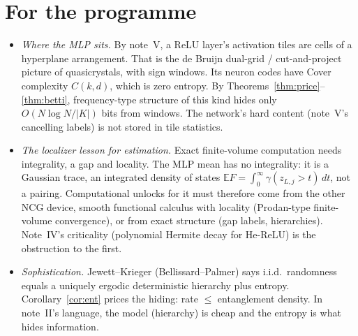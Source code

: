 \documentclass[11pt]{article}
\theoremstyle{definition}
\theoremstyle{remark}
\newcommand{\E}{\mathbb E}
\begin{document}
\section{For the programme}
\begin{itemize}
\item \emph{Where the MLP sits.} By note~V, a ReLU layer's activation tiles are cells of a hyperplane arrangement. That is the de Bruijn dual-grid / cut-and-project picture of quasicrystals, with sign windows. Its neuron codes have Cover complexity $C(k,d)$, which is zero entropy. By Theorems~\ref{thm:price}--\ref{thm:betti}, frequency-type structure of this kind hides only $O(N\log N/|K|)$ bits from windows. The network's hard content (note~V's cancelling labels) is not stored in tile statistics.
\item \emph{The localizer lesson for estimation.} Exact finite-volume computation needs integrality, a gap and locality. The MLP mean has no integrality: it is a Gaussian trace, an integrated density of states $\E F=\int_0^\infty\gamma(z_{L,j}>t)\,dt$, not a pairing. Computational unlocks for it must therefore come from the other NCG device, smooth functional calculus with locality (Prodan-type finite-volume convergence), or from exact structure (gap labels, hierarchies). Note~IV's criticality (polynomial Hermite decay for He-ReLU) is the obstruction to the first.
\item \emph{Sophistication.} Jewett--Krieger (Bellissard--Palmer) says i.i.d.\ randomness equals a uniquely ergodic deterministic hierarchy plus entropy. Corollary~\ref{cor:ent} prices the hiding: rate $\le$ entanglement density. In note~II's language, the model (hierarchy) is cheap and the entropy is what hides information.
\end{itemize}
\end{document}
